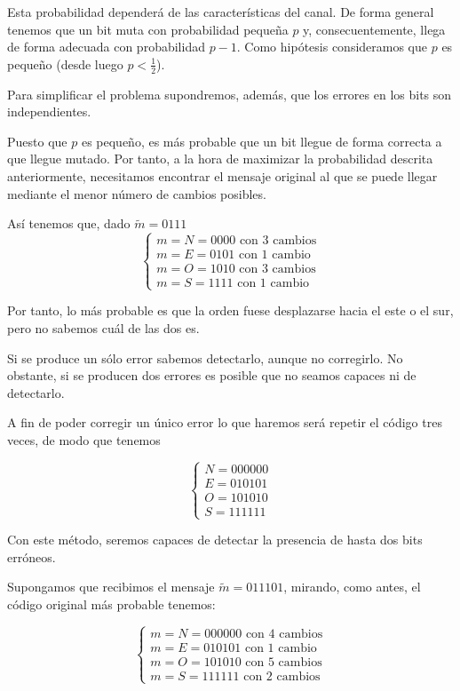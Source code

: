 \begin{example}
Esta probabilidad dependerá de las características del canal. De forma general tenemos que un bit muta con probabilidad pequeña $p$ y, consecuentemente, llega de forma adecuada con probabilidad $p-1$. Como hipótesis consideramos que $p$ es pequeño (desde luego $p<\frac{1}{2}$).

Para simplificar el problema supondremos, además, que los errores en los bits son independientes.

Puesto que $p$ es pequeño, es más probable que un bit llegue de forma correcta a que llegue mutado. Por tanto, a la hora de maximizar la probabilidad descrita anteriormente, necesitamos encontrar el mensaje original al que se puede llegar mediante el menor número de cambios posibles.

Así tenemos que, dado $\tilde{m} = 0111$
\[\left\{ \begin{array}{l}
m = N= 0000 \text{ con 3 cambios}\\ m= E = 0101 \text{ con 1 cambio }\\ m= O = 1010 \text{ con 3 cambios}\\ m =S = 1111 \text{ con 1 cambio}
\end{array}\right.\]

Por tanto, lo más probable es que la orden fuese desplazarse hacia el este o el sur, pero no sabemos cuál de las dos es.

\obs Si se produce un sólo error sabemos detectarlo, aunque no corregirlo. No obstante, si se producen dos errores es posible que no seamos capaces ni de detectarlo.

A fin de poder corregir un único error lo que haremos será repetir el código tres veces, de modo que tenemos

\[\left\{ \begin{array}{l}
N = 000000 \\ E = 010101 \\ O = 101010 \\ S = 111111
\end{array}\right.\]

Con este método, seremos capaces de detectar la presencia de hasta dos bits erróneos.

Supongamos que recibimos el mensaje $\tilde{m}=011101$, mirando, como antes, el código original más probable tenemos:

\[\left\{ \begin{array}{l}
m = N= 000000 \text{ con 4 cambios}\\ m= E = 010101 \text{ con 1 cambio }\\ m= O = 101010 \text{ con 5 cambios}\\ m =S = 111111 \text{ con 2 cambios}
\end{array}\right.\]


\end{example}
